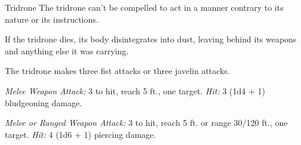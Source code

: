 \documentclass[10pt,a4paper,twoside,bg=print,twocolumn,openany,nodeprecatedcode]{dndbook}
\begin{document}
\begin{DndMonster}[float=t]{Tridrone}
\DndMonsterBasics[
armor-class = {15 (natural armor)},
hit-points = {\DndDice{3d8 + 3}},
speed = {30 ft.}
]
\DndMonsterAbilityScores[
 str = 12,
 dex = 13,
 con = 12,
 int = 9,
 wis = 10,
 cha = 9
]
\DndMonsterDetails[
senses = {truesight 120 ft., passive perception 10},
languages = {Modron},
challenge = 1/2,
]
The tridrone can't be compelled to act in a manner contrary to its nature or its instructions.

If the tridrone dies, its body disintegrates into dust, leaving behind its weapons and anything else it was carrying.

The tridrone makes three fist attacks or three javelin attacks.

\textsl{Melee Weapon Attack:} 3 to hit, reach 5 ft., one target. \textsl{Hit:} 3 (1d4 + 1) bludgeoning damage.

\textsl{Melee or Ranged Weapon Attack:} 3 to hit, reach 5 ft. or range 30/120 ft., one target. \textsl{Hit:} 4 (1d6 + 1) piercing damage.

\end{DndMonster}
\end{document}
